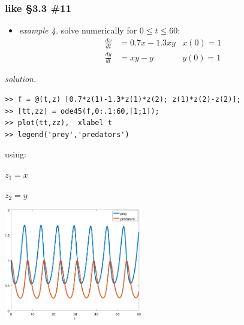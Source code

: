 \documentclass[urlcolor=blue,dvipsnames]{beamer}
\begin{document}
\begin{frame}[fragile]
\frametitle{like \S3.3 \#11}

\begin{itemize}
\item \emph{example 4.}  solve numerically for $0\le t\le 60$:
\begin{align*}
\frac{dx}{dt} &= 0.7 x - 1.3 xy & x(0)=1\\
\frac{dy}{dt} &= xy - y  & y(0)=1
\end{align*}
\end{itemize}

\vspace{-2mm}
\noindent \emph{solution.}
\begin{Verbatim}[fontsize=\small]
>> f = @(t,z) [0.7*z(1)-1.3*z(1)*z(2); z(1)*z(2)-z(2)];
>> [tt,zz] = ode45(f,0:.1:60,[1;1]);
>> plot(tt,zz),  xlabel t
>> legend('prey','predators')
\end{Verbatim}

\bigskip
using:

$z_1=x$

$z_2=y$

\vspace{-22mm}
\hfill \includegraphics[width=0.45\textwidth]{figs/lotka-time}
\end{frame}
\end{document}
